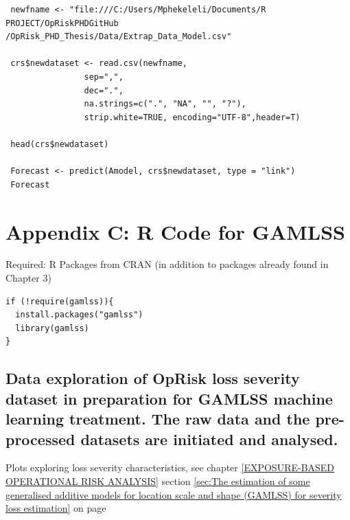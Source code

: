 \documentclass{DissertateUSU}
\begin{document}
\small

\begin{verbatim}
 newfname <- "file:///C:/Users/Mphekeleli/Documents/R PROJECT/OpRiskPHDGitHub
/OpRisk_PHD_Thesis/Data/Extrap_Data_Model.csv"

 crs$newdataset <- read.csv(newfname,
                sep=",",
                dec=".",
                na.strings=c(".", "NA", "", "?"),
                strip.white=TRUE, encoding="UTF-8",header=T)

 head(crs$newdataset)

 Forecast <- predict(Amodel, crs$newdataset, type = "link")
 Forecast
\end{verbatim}

\normalsize

\clearpage

\section{Appendix C: R Code for GAMLSS}
\label{sec:Appendix B: R Code for GAMLSS}

\singlespace

Required: R Packages from CRAN (in addition to packages already found in
Chapter 3)

\small

\begin{verbatim}
if (!require(gamlss)){
  install.packages("gamlss")
  library(gamlss)
}
\end{verbatim}

\normalsize

\subsection{Data exploration of OpRisk loss severity dataset in preparation for GAMLSS machine learning treatment. The raw data and the pre-processed datasets are initiated and analysed.}
\label{ssec:Data exploration GAMLSS}

Plots exploring loss severity characteristics, see chapter
\ref{EXPOSURE-BASED OPERATIONAL RISK ANALYSIS} section
\ref{sec:The estimation of some  generalised additive models for location scale and shape (GAMLSS) for severity loss estimation}
on page
\pageref{sec:The estimation of some  generalised additive models for location scale and shape (GAMLSS) for severity loss estimation}

\small
\end{document}
